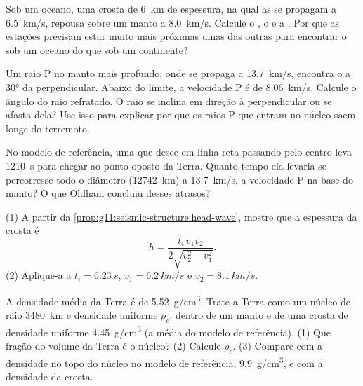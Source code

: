 \begin{exercise}[$\star\star$]\label{exo:g11:seismic-structure:9}
Sob um oceano, uma crosta de \qty{6}{km} de espessura, na qual as  se
propagam a \qty{6.5}{km/s}, repousa sobre um manto a \qty{8.0}{km/s}.
Calcule o , o  e a .
Por que as estações precisam estar muito mais próximas umas das outras para
encontrar o  sob um oceano do que sob um continente?
\end{exercise}

\begin{exercise}[$\star\star$]\label{exo:g11:seismic-structure:10}
Um raio P no manto mais profundo, onde se propaga a \qty{13.7}{km/s},
encontra o  a \ang{30} da perpendicular. Abaixo do
limite, a velocidade P é de \qty{8.06}{km/s}. Calcule o ângulo do raio
refratado. O raio se inclina em direção à perpendicular ou se afasta dela?
Use isso para explicar por que os raios P que entram no núcleo saem longe do
terremoto.
\end{exercise}

\begin{exercise}[$\star\star$]\label{exo:g11:seismic-structure:11}
No modelo de referência, uma  que desce em linha reta passando pelo
centro leva \qty{1210}{s} para chegar ao ponto oposto da Terra. Quanto tempo
ela levaria se percorresse todo o diâmetro (\qty{12742}{km}) a
\qty{13.7}{km/s}, a velocidade P na base do manto? O que Oldham concluiu
desses atrasos?
\end{exercise}

\begin{exercise}[$\star\star\star$]\label{exo:g11:seismic-structure:12}
(1) A partir da \cref{prop:g11:seismic-structure:head-wave}, mostre que a
espessura da crosta é
\[
  h = \frac{t_i\,v_1 v_2}{2\sqrt{v_2^2 - v_1^2}}.
\]
(2) Aplique-a a $t_i = \qty{6.23}{s}$, $v_1 = \qty{6.2}{km/s}$ e
$v_2 = \qty{8.1}{km/s}$.
\end{exercise}

\begin{exercise}[$\star\star\star$]\label{exo:g11:seismic-structure:13}
A densidade média da Terra é de \qty{5.52}{g/cm^3}. Trate a Terra como um
núcleo de raio \qty{3480}{km} e densidade uniforme $\rho_c$, dentro de um
manto e de uma crosta de densidade uniforme \qty{4.45}{g/cm^3} (a média do
modelo de referência). (1) Que fração do volume da Terra é o núcleo? (2)
Calcule $\rho_c$. (3) Compare com a densidade no topo do núcleo no modelo de
referência, \qty{9.9}{g/cm^3}, e com a densidade da crosta.
\end{exercise}

